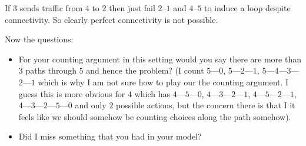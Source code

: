 \documentclass[letterpaper, 10pt]{article}
\begin{document}
If $3$ sends traffic from $4$ to $2$ then just fail $2$--$1$ and $4$--$5$ to induce a loop despite connectivity. So
clearly perfect connectivity is not possible. 

Now the questions:
\begin{itemize}
    \item For your counting argument in this setting would you say there are more than $3$ paths through $5$ and hence
        the problem? (I count $5$---$0$, $5$---$2$---$1$, $5$---$4$---$3$---$2$---$1$ which is why I am not sure how to
        play our the counting argument. I guess this is more obvious for $4$ which has $4$---$5$---$0$,
        $4$---$3$---$2$---$1$, $4$---$5$---$2$---$1$, $4$---$3$---$2$---$5$---$0$ and only $2$ possible actions, but the
        concern there is that I it feels like we should somehow be counting choices along the path somehow).
    \item Did I miss something that you had in your model?
\end{itemize}
\end{document}

